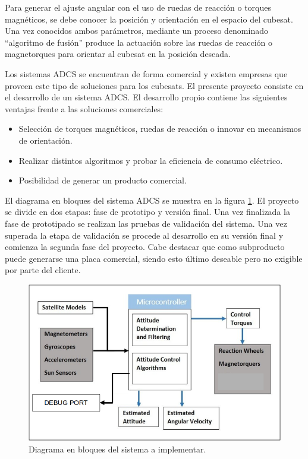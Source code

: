 \documentclass[
11pt, %
]{charter}
\begin{document}
Para generar el ajuste angular con el uso de ruedas de reacción o torques magnéticos, se debe  conocer la posición y orientación en el espacio del cubesat. Una vez conocidos ambos parámetros, mediante un proceso denominado “algoritmo de fusión” produce la actuación sobre las ruedas de reacción o magnetorques para orientar al cubesat en la posición deseada.

 Los sistemas ADCS se encuentran de forma comercial y  existen empresas que proveen este tipo de soluciones para los cubesats. El presente proyecto consiste en el desarrollo de un sistema ADCS. El desarrollo propio contiene las siguientes ventajas frente a las soluciones comerciales: 
\begin{itemize}
	\item Selección de torques magnéticos, ruedas de reacción o innovar en mecanismos de orientación. 
	\item Realizar distintos algoritmos y probar la eficiencia de consumo eléctrico. 
	\item Posibilidad de generar un producto comercial. 
\end{itemize}


El diagrama en bloques del sistema ADCS se muestra en la figura \ref{fig:adcs}. El proyecto se divide en dos etapas: fase de prototipo y versión final. Una vez finalizada la fase de prototipado se realizan las pruebas de validación del sistema.  Una vez superada la etapa de validación se procede al desarrollo en su versión final y comienza la segunda fase del proyecto. 
Cabe destacar que como subproducto puede generarse una placa comercial, siendo esto último deseable pero no exigible por parte del cliente. 

\begin{figure}[htpb]
	\centering 
	\includegraphics[width=.8\textwidth]{Figuras/sistemaadcs.png}
	\caption{Diagrama en bloques del sistema a implementar.}
	\label{fig:adcs}
\end{figure}
\end{document}
